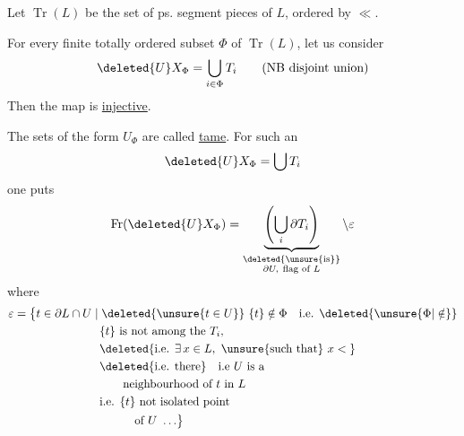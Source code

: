 
Let $\operatorname{Tr}(L)$ be the  set of ps. segment pieces of $L$, ordered by $\ll$.

For every finite totally ordered subset $\Phi$ of $\operatorname{Tr}(L)$, let us consider
\[
\deleted{U}X_{\Phi}=\bigcup_{i\in\Phi}T_i\qquad\text{(NB disjoint union)}
\]
Then the map
is \uline{injective}.

The sets of the form $U_{\Phi}$ are called \uline{tame}. For such an
\[
\deleted{U}X_{\Phi}=\bigcup T_i
\]
one puts
\[
\operatorname{Fr}(\deleted{U}X_{\Phi})=
\underbrace{\left(\bigcup_i\partial T_i\right)}_{\substack{\deleted{\text{\unsure{is}}}\\\partial U,\ \text{flag of } L}}\setminus\varepsilon
\]
where
\[
\begin{aligned}
\varepsilon={}&\bigl\{t\in\partial L\cap U\mid
  \deleted{\unsure{t\in U}}\ \{t\}\notin\Phi\quad\text{i.e. }\deleted{\unsure{\Phi|\notin}}\\
&\hspace{6em}\{t\}\text{ is not among the }T_i,\\
&\hspace{6em}\deleted{\text{i.e. }\exists\,x\in L,\ \text{\unsure{such that} } x<{}}\\
&\hspace{6em}\deleted{\text{i.e. there}}\quad\text{i.e }U\text{ is a}\\
&\hspace{8em}\text{neighbourhood of }t\text{ in } L\\
&\hspace{6em}\text{i.e. }\{t\}\text{ not isolated point}\\
&\hspace{9em}\text{of }U\ \ldots\bigr\}
\end{aligned}
\]
